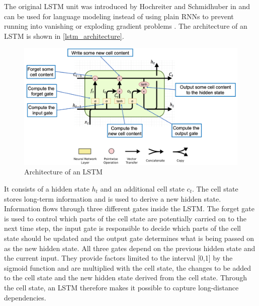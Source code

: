 The original \ac{LSTM} unit was introduced by Hochreiter and Schmidhuber in \cite{Hochreiter1997} and can be used for language modeling instead of using plain \acp{RNN} to prevent running into vanishing or exploding gradient problems \cite{Sundermeyer2012}. The architecture of an \ac{LSTM} is shown in \autoref{lstm_architecture}.

\begin{figure}[ht]
	\centering
	\includegraphics[width=\linewidth]{figures/lstm_architecture.png}
	\caption{Architecture of an \ac{LSTM} \cite{Gertz2020}}
	\label{lstm_architecture}
\end{figure}

It consists of a hidden state $h_t$ and an additional cell state $c_t$. The cell state stores long-term information and is used to derive a new hidden state. Information flows through three different gates inside the \ac{LSTM}. The forget gate is used to control which parts of the cell state are potentially carried on to the next time step, the input gate is responsible to decide which parts of the cell state should be updated and the output gate determines what is being passed on as the new hidden state. All three gates depend on the previous hidden state and the current input. They provide factors limited to the interval [0,1] by the sigmoid function and are multiplied with the cell state, the changes to be added to the cell state and the new hidden state derived from the cell state. Through the cell state, an \ac{LSTM} therefore makes it possible to capture long-distance dependencies. \cite{Gertz2020}

